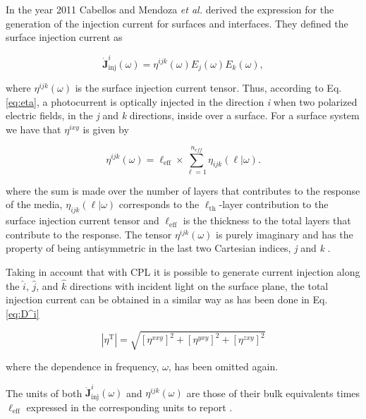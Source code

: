 \documentclass[aps,pra,11pt,tightenlines,showpacs,superscriptaddress,groupedaddress]{revtex4-1}
\newcommand{\ea}{$\eta^{ixy}$}
\begin{document}
In the year 2011 Cabellos and Mendoza \emph{et al.} \cite{cabellos2011optical}
derived the expression for the generation of the injection current for surfaces
and interfaces. They defined the surface injection current as

\begin{equation}
    \mathbf{\dot{J}}^{i}_{\text{inj}}(\omega) =
    \eta^{ijk}(\omega)E_{j}(\omega)E_{k}(\omega), \label{eq:eta}
\end{equation}

\noindent where $\eta^{ijk}(\omega)$ is the surface injection current tensor.
Thus, according to Eq. \ref{eq:eta}, a photocurrent is optically injected in
the direction \emph{i} when two polarized electric fields, in the \emph{j} and
\emph{k} directions, inside over a surface. For a surface system we have that
{\ea} is given by \cite{cabellos2011optical, arzate2014optical}

\begin{equation}
    \eta^{ijk} (\omega) = \ell_{\text{eff}} \times \sum_{\ell=1}^{n_{eff}}
    \eta_{ijk} (\ell|\omega). \label{eq:etaeff}
\end{equation}

\noindent where the sum is made over the number of layers that contributes to
the response of the media, $\eta_{ijk} (\ell|\omega)$ corresponds to the
$\ell_{\text{th}}$-layer contribution to the surface injection current tensor
and $\ell_{\text{eff}}$ is the thickness to the total layers that contribute to
the response. The tensor $\eta^{ijk}(\omega)$ is purely imaginary and has the
property of being antisymmetric in the last two Cartesian indices, \emph{j} and
\emph{k} \cite{sipe2000second,nastos2006optical}.

Taking in account that with CPL it is possible to generate current injection
along the $\hat{i}$, $\hat{j}$, and $\hat{k}$ directions with incident light on
the surface plane, the total injection current can be obtained in a similar way
as has been done in Eq. \ref{eq:D^i}

\begin{equation*}
    |{\eta^{\text{T}}}| = \sqrt{ \left[ \eta^{xxy} \right]^{2} + \left[
    \eta^{yxy} \right]^{2} + \left[ \eta^{zxy} \right]^{2} }
\end{equation*}

\noindent where the dependence in frequency, $\omega$, has been omitted again.

The units of both $\mathbf{\dot{J}}^{i}_{\text{inj}}(\omega)$ and $\eta^{ijk}
(\omega)$  are those of their bulk equivalents times $\ell_{\text{eff}}$
expressed in the corresponding units to report \cite{cabellos2011optical}.
\end{document}
